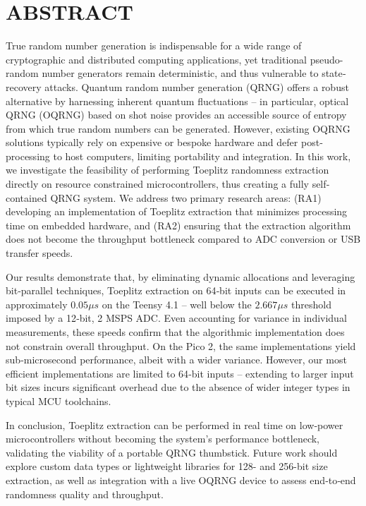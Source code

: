 \section{ABSTRACT}\label{abstract}

True random number generation is indispensable for a wide range of cryptographic and distributed computing applications, yet traditional pseudo-random number generators remain deterministic, and thus vulnerable to state‐recovery attacks. Quantum random number generation (QRNG) offers a robust alternative by harnessing inherent quantum fluctuations -- in particular, optical QRNG (OQRNG) based on shot noise provides an accessible source of entropy from which true random numbers can be generated. However, existing OQRNG solutions typically rely on expensive or bespoke hardware and defer post‐processing to host computers, limiting portability and integration. In this work, we investigate the feasibility of performing Toeplitz randomness extraction directly on resource constrained microcontrollers, thus creating a fully self‐contained QRNG system. We address two primary research areas: (RA1) developing an implementation of Toeplitz extraction that minimizes processing time on embedded hardware, and (RA2) ensuring that the extraction algorithm does not become the throughput bottleneck compared to ADC conversion or USB transfer speeds.

Our results demonstrate that, by eliminating dynamic allocations and leveraging bit‐parallel techniques, Toeplitz extraction on 64‐bit inputs can be executed in approximately \(0.05 \mu s\) on the Teensy 4.1 -- well below the \(2.667 \mu s\) threshold imposed by a 12‐bit, 2 MSPS ADC. Even accounting for variance in individual measurements, these speeds confirm that the algorithmic implementation does not constrain overall throughput. On the Pico 2, the same implementations yield sub‐microsecond performance, albeit with a wider variance. However, our most efficient implementations are limited to 64‐bit inputs -- extending to larger input bit sizes incurs significant overhead due to the absence of wider integer types in typical MCU toolchains.

In conclusion, Toeplitz extraction can be performed in real time on low‐power microcontrollers without becoming the system's performance bottleneck, validating the viability of a portable QRNG thumbstick. Future work should explore custom data types or lightweight libraries for 128- and 256-bit size extraction, as well as integration with a live OQRNG device to assess end‐to‐end randomness quality and throughput.

